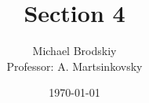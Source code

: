 


\title{Section 4}
\date{\today}
\author{Michael Brodskiy\\ \small Professor: A. Martsinkovsky}



\maketitle

\newpage

\tableofcontents

\newpage

